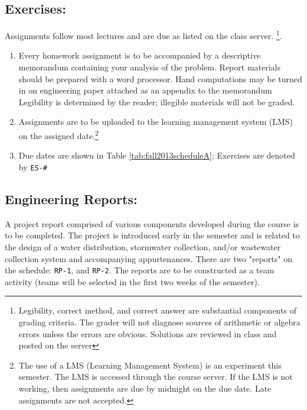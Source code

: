 \documentclass[12pt]{article}
\begin{document}
\subsection*{Exercises:} 
Assignments follow most lectures and are due as listed on the class server.  
\footnote{Legibility, correct method, and correct answer are substantial components of grading criteria.   The grader will not diagnose sources of arithmetic or algebra errors unless the errors are obvious.  Solutions are reviewed in class and posted on the server}.
\begin{enumerate}
\item Every homework assignment is to be accompanied by a descriptive memorandum containing your analysis
of the problem. 
Report materials should be prepared with a word processor. 
Hand computations may be turned in on engineering paper attached as an appendix to the memorandum
Legibility is determined by the reader; illegible materials will not be graded.
\item Assignments are to be uploaded to the learning management system (LMS) on the assigned date.\footnote{The use of a LMS (Learning Management System) is an experiment this semester.  The LMS is accessed through the course server.  If the LMS is not working, then assignments are due by midnight on the due date. Late assignments are not accepted.}
\item Due dates are shown in Table \ref{tab:fall2013scheduleA};  Exercises are denoted by \texttt{ES-\#}
\end{enumerate}

\subsection*{Engineering Reports:}  
A project report comprised of various components developed during the course is to be completed.  
The project is introduced early in the semester and is related to the design of a water distribution, stormwater collection, and/or wastewater collection system and accompanying appurtenances.    
There are two "reports" on the schedule: \texttt{RP-1}, and \texttt{RP-2}.  
The reports are to be constructed as a team activity (teams will be selected in the first two weeks of the semester).
\end{document}
